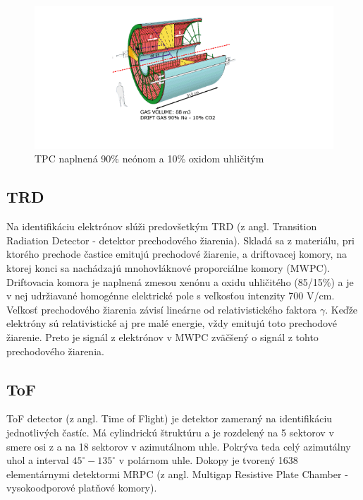 \documentclass[thesismargins, thesislinespacing]{rnthesis}
\begin{document}
\begin{figure}[hbtp!]
	\begin{center}
		\includegraphics[width=\textwidth]{./Obrazky_praca/tpc.png}
		\caption{TPC naplnená 90\% neónom a 10\% oxidom uhličitým~\cite{TPCobr}}
		\label{tpc}
	\end{center}
\end{figure}

\subsection{TRD}
Na identifikáciu elektrónov slúži predovšetkým TRD (z angl. Transition Radiation Detector - detektor prechodového žiarenia). Skladá sa z materiálu, pri ktorého prechode častice emitujú prechodové žiarenie, a driftovacej komory, na ktorej konci sa nachádzajú mnohovláknové proporciálne komory (MWPC). Driftovacia komora je naplnená zmesou xenónu a oxidu uhličitého (85/15\%) a je v nej udržiavané homogénne elektrické pole s veľkosťou intenzity 700 V/cm. Veľkosť prechodového žiarenia závisí lineárne od relativistického faktora $\gamma$. Keďže elektróny sú relativistické aj pre malé energie, vždy emitujú toto prechodové žiarenie. Preto je signál z elektrónov v MWPC zväčšený o signál z tohto prechodového žiarenia.

\subsection{ToF}
ToF detector (z angl. Time of Flight) je detektor zameraný na identifikáciu jednotlivých častíc. Má cylindrickú štruktúru a je rozdelený na 5 sektorov v smere osi z a na 18 sektorov v azimutálnom uhle. Pokrýva teda celý azimutálny uhol a interval $45^\circ - 135^\circ$ v polárnom uhle. Dokopy je tvorený 1638 elementárnymi detektormi MRPC (z angl. Multigap Resistive Plate Chamber - vysokoodporové platňové komory).
\end{document}
